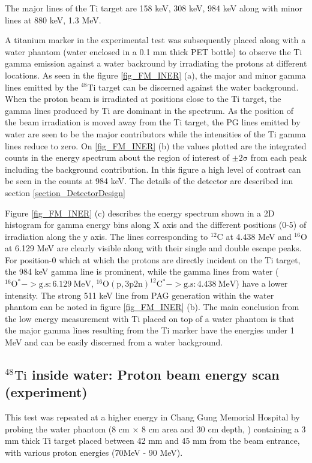 \documentclass[11pt,a4paper]{article}
\begin{document}
The major lines of the Ti target are 158 keV, 308 keV, 984 keV along with minor lines at 880 keV, 1.3 MeV.

A titanium marker in the experimental test was subsequently placed along with a water phantom (water enclosed in a 0.1 mm thick PET bottle) to observe the Ti gamma emission  against a water backround by irradiating the protons  at different locations. As seen in the figure \ref{fig_FM_INER} (a), the major and minor gamma lines emitted by the $\mathrm{^{48}Ti}$  target can be discerned against the water background. When the proton beam is irradiated at positions close to the Ti target, the gamma lines produced by Ti are dominant in the spectrum. As the position of the beam irradiation is moved away from the Ti target, the PG lines emitted by water  are seen to be the major contributors while the intensities  of the Ti gamma lines reduce to zero. On \ref{fig_FM_INER} (b) the values plotted are the integrated counts in the energy spectrum about the region of interest of $\mathrm{\pm2\sigma}$ from each peak including the background contribution. In this figure a high level of contrast can be seen in the counts at 984 keV. The details of the detector are described inn section \ref{section_DetectorDesign} 


Figure \ref{fig_FM_INER}  (c) describes the energy spectrum shown in a 2D histogram for gamma energy bins along X axis and the different positions (0-5) of irradiation along the y axis. The lines corresponding to $\mathrm{^{12}C}$ at 4.438 MeV and $\mathrm{^{16}O}$  at 6.129 MeV are clearly visible along with their single and double escape peaks. For position-0 which at which the protons are  directly incident on the Ti target, the 984 keV gamma line is prominent, while the gamma lines from water ($\mathrm{^{16}O^*->g.s:6.129\ MeV}$, $\mathrm{^{16}O(p,3p2n)^{12}C^*->g.s:4.438\ MeV}$) have a  lower intensity. The strong 511 keV line from PAG generation within the water phantom can be  noted in figure \ref{fig_FM_INER} (b). The main conclusion from the low energy measurement with Ti placed on top of a water phantom is that the major  gamma lines resulting from the Ti marker have the energies under 1 MeV and can be easily discerned from a water background.


\subsection{$\mathrm{^{48}Ti}$ inside water: Proton beam energy scan (experiment) }
This test was repeated at a higher energy in Chang Gung Memorial Hospital by probing the water phantom (8 cm $\mathrm{\times}$ 8 cm area and 30 cm depth, ) containing a 3 mm thick Ti target placed between 42 mm and 45 mm from the beam entrance, with various proton energies (70MeV - 90 MeV). 
\end{document}
